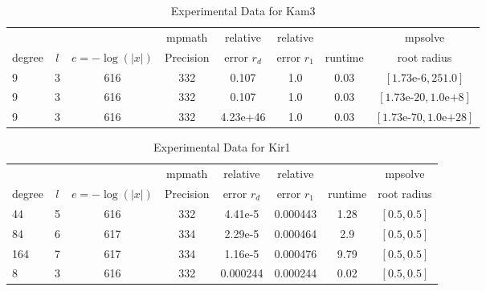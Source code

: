 \documentclass[sigconf]{acmart}
\begin{document}
\begin{table}[t]
\caption{Experimental Data for Kam3}
\label{tab:kam3}
\vskip -0.15in
\begin{center}
\begin{small}
\begin{sc}
\begin{tabular}{lccccccc}
\toprule
&  &  & mpmath & relative  & relative &  & mpsolve \\
degree  & $l$& $e=-\log(|x|)$& Precision &error $r_d$       & error $r_1$ &runtime& root radius\\
\midrule
 9 & 3 & 616 & 332 & 0.107 & 1.0 & 0.03 & $[1.73\text{e-}6, 251.0]$\\
 9 & 3 & 616 & 332 & 0.107 & 1.0 & 0.03 & $[1.73\text{e-}20, 1.0\text{e+}8]$\\
 9 & 3 & 616 & 332 & 4.23e+46 & 1.0 & 0.03 & $[1.73\text{e-}70, 1.0\text{e+}28]$\\
\bottomrule
\end{tabular}
\end{sc}
\end{small}
\end{center}
\vskip 0.05in
\end{table}

\begin{table}[t]
\caption{Experimental Data for Kir1}
\label{tab:kir1}
\vskip -0.15in
\begin{center}
\begin{small}
\begin{sc}
\begin{tabular}{lccccccc}
\toprule
&  &  & mpmath & relative  & relative &  & mpsolve \\
degree  & $l$& $e=-\log(|x|)$& Precision &error $r_d$       & error $r_1$ &runtime& root radius\\
\midrule
 44 & 5 & 616 & 332 & 4.41e-5 & 0.000443 & 1.28 & $[0.5, 0.5]$\\
  84 & 6 & 617 & 334 & 2.29e-5 & 0.000464 & 2.9 & $[0.5, 0.5]$\\
 164 & 7 & 617 & 334 & 1.16e-5 & 0.000476 & 9.79 & $[0.5, 0.5]$\\
 8 & 3 & 616 & 332 & 0.000244 & 0.000244 & 0.02 & $[0.5, 0.5]$\\ %
\bottomrule 
\end{tabular}
\end{sc}
\end{small}
\end{center}
\vskip 0.05in
\end{table}
\end{document}
